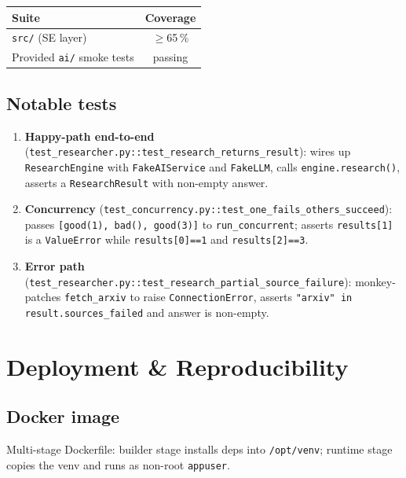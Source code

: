 \documentclass[11pt,a4paper]{article}
\begin{document}
\begin{center}\small
\begin{tabular}{lc}
\toprule
\textbf{Suite} & \textbf{Coverage} \\
\midrule
\texttt{src/} (SE layer) & $\geq$65\,\% \\
Provided \texttt{ai/} smoke tests & passing \\
\bottomrule
\end{tabular}
\end{center}

\subsection{Notable tests}

\begin{enumerate}
  \item \textbf{Happy-path end-to-end} (\texttt{test\_researcher.py::test\_research\_returns\_result}): wires up \texttt{ResearchEngine} with \texttt{FakeAIService} and \texttt{FakeLLM}, calls \texttt{engine.research()}, asserts a \texttt{ResearchResult} with non-empty answer.
  \item \textbf{Concurrency} (\texttt{test\_concurrency.py::test\_one\_fails\_others\_succeed}): passes \texttt{[good(1), bad(), good(3)]} to \texttt{run\_concurrent}; asserts \texttt{results[1]} is a \texttt{ValueError} while \texttt{results[0]==1} and \texttt{results[2]==3}.
  \item \textbf{Error path} (\texttt{test\_researcher.py::test\_research\_partial\_source\_failure}): monkey-patches \texttt{fetch\_arxiv} to raise \texttt{ConnectionError}, asserts \texttt{"arxiv" in result.sources\_failed} and answer is non-empty.
\end{enumerate}

\section{Deployment \& Reproducibility}\label{sec:deploy}

\subsection{Docker image}

Multi-stage Dockerfile: builder stage installs deps into \texttt{/opt/venv}; runtime stage copies the venv and runs as non-root \texttt{appuser}.
\end{document}
